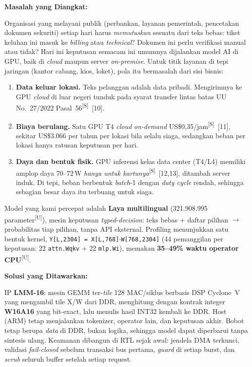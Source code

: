 \documentclass[10pt]{article}
\newcommand{\code}[1]{\texttt{\small #1}}
\newcommand{\lbl}[1]{\textbf{#1}\par}
\newcommand{\U}{\textsuperscript{[U]}}
\newcommand{\Sx}{\textsuperscript{[S]}}
\begin{document}
\lbl{Masalah yang Diangkat:}
Organisasi yang melayani publik (perbankan, layanan pemerintah, pencetakan dokumen sekuriti) setiap hari harus \emph{memutuskan} sesuatu dari teks bebas: tiket keluhan ini masuk ke \emph{billing} atau \emph{technical}? Dokumen ini perlu verifikasi manual atau tidak? Hari ini keputusan semacam ini umumnya dijalankan model AI di GPU, baik di \emph{cloud} maupun server \emph{on-premise}. Untuk titik layanan di tepi jaringan (kantor cabang, kios, loket), pola itu bermasalah dari sisi bisnis:
\begin{enumerate}
\item \textbf{Data keluar lokasi.} Teks pelanggan adalah data pribadi. Mengirimnya ke GPU \emph{cloud} di luar negeri tunduk pada syarat transfer lintas batas UU No.~27/2022 Pasal~56\Sx~[10].
\item \textbf{Biaya berulang.} Satu GPU T4 \emph{cloud} \emph{on-demand} US\$0,35/jam\Sx~[11], sekitar US\$3.066 per tahun per lokasi bila selalu siaga, sedangkan beban per lokasi hanya ratusan keputusan per hari.
\item \textbf{Daya dan bentuk fisik.} GPU inferensi kelas data center (T4/L4) memiliki amplop daya 70--72\,W \emph{hanya untuk kartunya}\Sx~[12,13], ditambah server induk. Di tepi, beban berbentuk \emph{batch}-1 dengan \emph{duty cycle} rendah, sehingga sebagian besar daya itu terbuang untuk siaga.
\end{enumerate}
Model yang kami percepat adalah \textbf{Laya multilingual} (321.908.995 parameter\U), mesin keputusan \emph{typed-decision}: teks bebas + daftar pilihan $\rightarrow$ probabilitas tiap pilihan, tanpa API eksternal. Profiling menunjukkan satu bentuk kernel, \code{Y[L,2304] = X[L,768]$\cdot$W[768,2304]} (44 pemanggilan per keputusan: 22 \code{attn.Wqkv} + 22 \code{mlp.Wi}), memakan \textbf{35--49\% waktu operator CPU}\U.

\lbl{Solusi yang Ditawarkan:}
IP \textbf{LMM-16}: mesin GEMM ter-\emph{tile} 128 MAC/siklus berbasis DSP Cyclone~V yang mengambil tile X/W dari DDR, menghitung dengan kontrak integer \textbf{W16A16} yang bit-exact, lalu menulis hasil INT32 kembali ke DDR. Host (ARM) tetap menjalankan tokenizer, operator lain, dan keputusan akhir. Bobot tetap berupa \emph{data} di DDR, bukan logika, sehingga model dapat diperbarui tanpa sintesis ulang. Keamanan dibangun di RTL sejak awal: jendela DMA terkunci, validasi \emph{fail-closed} sebelum transaksi bus pertama, \emph{guard} di setiap burst, dan \emph{scrub} seluruh buffer setelah setiap request.
\end{document}

